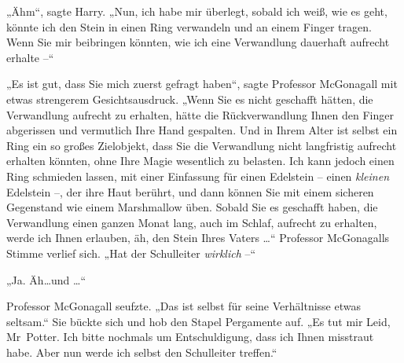 „Ähm“, sagte Harry. „Nun, ich habe mir überlegt, sobald ich weiß, wie es geht, könnte ich den Stein in einen Ring verwandeln und an einem Finger tragen. Wenn Sie mir beibringen könnten, wie ich eine Verwandlung dauerhaft aufrecht erhalte –“

„Es ist gut, dass Sie mich zuerst gefragt haben“, sagte Professor McGonagall mit etwas strengerem Gesichtsausdruck. „Wenn Sie es nicht geschafft hätten, die Verwandlung aufrecht zu erhalten, hätte die Rückverwandlung Ihnen den Finger abgerissen und vermutlich Ihre Hand gespalten. Und in Ihrem Alter ist selbst ein Ring ein so großes Zielobjekt, dass Sie die Verwandlung nicht langfristig aufrecht erhalten könnten, ohne Ihre Magie wesentlich zu belasten. Ich kann jedoch einen Ring schmieden lassen, mit einer Einfassung für einen Edelstein – einen \emph{kleinen} Edelstein –, der ihre Haut berührt, und dann können Sie mit einem sicheren Gegenstand wie einem Marshmallow üben. Sobald Sie es geschafft haben, die Verwandlung einen ganzen Monat lang, auch im Schlaf, aufrecht zu erhalten, werde ich Ihnen erlauben, äh, den Stein Ihres Vaters …“ Professor McGonagalls Stimme verlief sich. „Hat der Schulleiter \emph{wirklich} –“

„Ja. Äh…und …“

Professor McGonagall seufzte. „Das ist selbst für seine Verhältnisse etwas seltsam.“ Sie bückte sich und hob den Stapel Pergamente auf. „Es tut mir Leid, Mr~Potter. Ich bitte nochmals um Entschuldigung, dass ich Ihnen misstraut habe. Aber nun werde ich selbst den Schulleiter treffen.“

